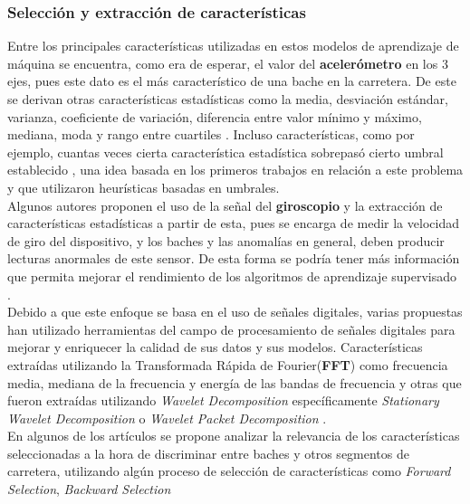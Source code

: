 		\subsubsection{Selección y extracción de características}
			Entre los principales características utilizadas en estos modelos de aprendizaje de máquina se encuentra, como era de esperar, el valor 
			del \textbf{acelerómetro} en los 3 ejes, pues este dato es el más característico de una bache en la carretera. De este se derivan otras
			características estadísticas como la media, desviación estándar, varianza, coeficiente de variación, diferencia entre valor mínimo y
			máximo, mediana, moda y rango entre cuartiles . Incluso características, como por ejemplo, cuantas veces cierta característica estadística sobrepasó cierto umbral
			establecido , una idea basada en los primeros trabajos en relación a este problema y que utilizaron
			heurísticas basadas en umbrales.\\
			\indent Algunos autores proponen el uso de la señal del \textbf{giroscopio} y la extracción de características estadísticas a partir de esta,
			pues se encarga de medir la velocidad de giro del dispositivo, y los baches y las anomalías en general, deben producir lecturas anormales
			de este sensor. De esta forma se podría tener más información que permita mejorar el rendimiento de los algoritmos de aprendizaje
			supervisado .\\
			\indent Debido a que este enfoque se basa en el uso de señales digitales, varias propuestas han utilizado herramientas del campo de procesamiento
			de señales digitales para mejorar y enriquecer la calidad de sus datos y sus modelos. Características extraídas utilizando la Transformada
			Rápida de Fourier(\textbf{FFT}) como frecuencia media, mediana de la frecuencia y energía de las bandas de frecuencia  y otras que fueron extraídas utilizando \emph{Wavelet Decomposition} específicamente \emph{Stationary Wavelet
			Decomposition}  o \emph{Wavelet Packet Decomposition} .\\
			\indent En algunos de los artículos se propone analizar la relevancia de los características seleccionadas a la hora de discriminar entre baches y otros
			segmentos de carretera, utilizando algún proceso de selección de características como \emph{Forward Selection}, \emph{Backward Selection}
